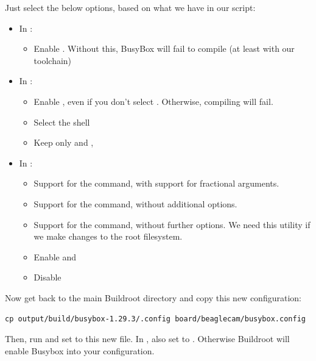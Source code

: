 Just select the below options, based on what we have in our
 script:
\begin{itemize}
  \item In :
  \begin{itemize}
     \item Enable . Without this, BusyBox
           will fail to compile (at least with our toolchain)
  \end{itemize}
  \item In :
  \begin{itemize}
     \item Enable , even
	   if you don't select . Otherwise, compiling
            will fail. 
     \item Select the  shell
     \item Keep only  and
           ,
  \end{itemize}
  \item In :
  \begin{itemize}
     \item Support for the  command, with support for fractional arguments.
     \item Support for the  command, without additional options.
     \item Support for the  command, without further options.
           We need this utility if we make changes to the root filesystem.
     \item Enable  and \code{test as [}
     \item Disable 
  \end{itemize}
\end{itemize}

Now get back to the main Buildroot directory and copy this new
configuration:

\begin{verbatim}
cp output/build/busybox-1.29.3/.config board/beaglecam/busybox.config
\end{verbatim}

Then, run  and set
 to this new file. In , also set  to . Otherwise
Buildroot will enable Busybox  into your configuration.

